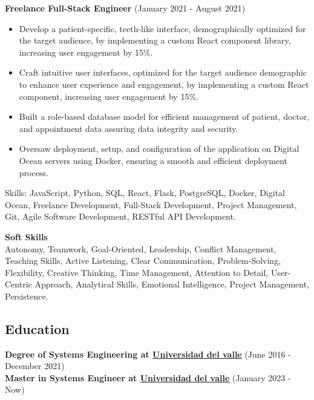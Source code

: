 \documentclass[letterpaper,10pt]{article}
\begin{document}
  \vspace*{0.2cm}
  \textbf{Freelance Full-Stack Engineer} (January 2021 - August 2021)
  \hfill
  \vspace*{0.2cm}
  \begin{minipage}{\linewidth}
    \begin{itemize}[noitemsep]
      \item Develop a patient-specific, teeth-like interface, demographically optimized for the target audience, by implementing a custom React component library, increasing user engagement by 15\%.
      \item Craft intuitive user interfaces, optimized for the target audience demographic to enhance user experience and engagement, by implementing a custom React component, increasing user engagement by 15\%.
      \item Built a role-based database model for efficient management of patient, doctor, and appointment data assuring data integrity and security.
      \item Oversaw deployment, setup, and configuration of the application on Digital Ocean servers using Docker, ensuring a smooth and efficient deployment process.
    \end{itemize}
    \hfill
  \end{minipage}
  Skills: JavaScript, Python, SQL, React, Flask, PostgreSQL, Docker, Digital Ocean, Freelance Development, Full-Stack Development, Project Management, Git, Agile Software Development, RESTful API Development.

  \vspace*{0.2cm}
  \textbf{Soft Skills}\\
  Autonomy, Teamwork, Goal-Oriented, Leadership, Conflict Management, Teaching Skills, Active Listening, Clear Communication, Problem-Solving, Flexibility, Creative Thinking, Time Management, Attention to Detail, User-Centric Approach, Analytical Skills, Emotional Intelligence, Project Management, Persistence.
  
  \newpage
  \subsection*{Education}
  \vspace*{0.2cm}
  \textbf{Degree of Systems Engineering at  \href{https://www.univalle.edu.co/}{Universidad del valle}} \hfill (June 2016 - December 2021)\\
  \textbf{Master in Systems Engineer at  \href{https://www.univalle.edu.co/}{Universidad del valle}} \hfill (January 2023 - Now)
\end{document}
